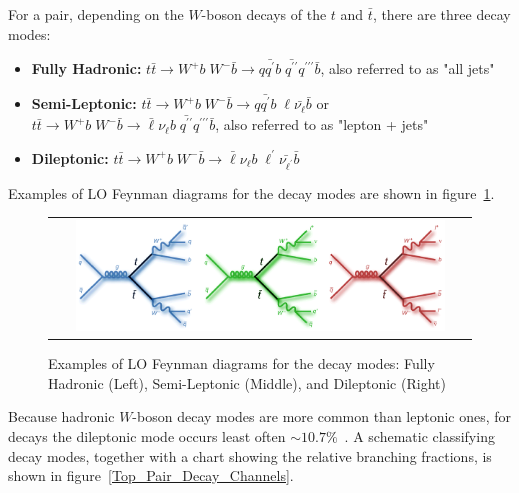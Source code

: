 For a \ttbar pair, depending on the $W$-boson decays of the $t$ and $\bar{t}$, there are three decay modes: 
\begin{itemize}
    \item {\bf Fully Hadronic:} $t\bar{t} \rightarrow W^+ b \; W^- \bar{b} \rightarrow q \bar{q^\prime} b \; \bar{q^{\prime\prime}}  q^{\prime\prime\prime} \bar{b}$, also referred to as "all jets"
    \item {\bf Semi-Leptonic:} $t\bar{t} \rightarrow W^+ b \; W^- \bar{b} \rightarrow  q \bar{q^\prime} b \; \ell \bar{\nu_{\ell}} \bar{b} $ or $t\bar{t} \rightarrow W^+ b \; W^- \bar{b} \rightarrow  \bar{\ell} \nu_\ell b \; \bar{q^{\prime\prime}}  q^{\prime\prime\prime} \bar{b}$, also referred to as "lepton + jets"
    \item {\bf Dileptonic:} $t\bar{t} \rightarrow W^+ b \; W^- \bar{b} \rightarrow \bar{\ell} \nu_\ell b \; \ell^{\prime} \bar{\nu_{\ell^{\prime}}} \bar{b}$
\end{itemize}
Examples of LO Feynman diagrams for the \ttbar decay modes are shown in figure~\ref{Top_Pair_Decay_FeynmanDiagrams}.
\begin{figure}[!h]
  \begin{center}
    \begin{tabular}{c}
        \includegraphics[width=0.90\textwidth]{fig_TopQuark/ttbar_decay_feynman_diagrams.png}
    \end{tabular}
    \caption{Examples of LO Feynman diagrams for the \ttbar decay modes: Fully Hadronic (Left), Semi-Leptonic (Middle), and Dileptonic (Right)~\cite{d0_diagrams}
            }
    \label{Top_Pair_Decay_FeynmanDiagrams}
  \end{center}
\end{figure}
Because hadronic $W$-boson decay modes are more common than leptonic ones, for \ttbar decays the dileptonic mode occurs least often $\sim 10.7 \%$~\cite{bib:PDG}.
A schematic classifying \ttbar decay modes, together with a chart showing the relative branching fractions, is shown in figure~\ref{Top_Pair_Decay_Channels}.
